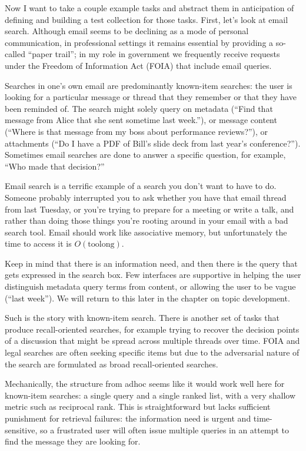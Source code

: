 \documentclass[nobib]{tufte-book}
\begin{document}
Now I want to take a couple example tasks and abstract them in anticipation of defining and building a test collection for those tasks.  First, let's look at email search.  Although email seems to be declining as a mode of personal communication, in professional settings it remains essential by providing a so-called ``paper trail''; in my role in government we frequently receive requests under the Freedom of Information Act (FOIA) that include email queries.

Searches in one's own email are predominantly known-item searches: the user is looking for a particular message or thread that they remember or that they have been reminded of.  The search might solely query on metadata (``Find that message from Alice that she sent sometime last week.''), or message content (``Where is that message from my boss about performance reviews?''), or attachments (``Do I have a PDF of Bill's slide deck from last year's conference?'').  Sometimes email searches are done to answer a specific question, for example, ``Who made that decision?''

Email search is a terrific example of a search you don't want to have to do.  Someone probably interrupted you to ask whether you have that email thread from last Tuesday, or you're trying to prepare for a meeting or write a talk, and rather than doing those things you're rooting around in your email with a bad search tool.  Email should work like associative memory, but unfortunately the time to access it is $O(\mathrm{too long})$.

Keep in mind that there is an information need, and then there is the query that gets expressed in the search box.  Few interfaces are supportive in helping the user distinguish metadata query terms from content, or allowing the user to be vague (``last week'').  We will return to this later in the chapter on topic development.

Such is the story with known-item search.  There is another set of tasks that produce recall-oriented searches, for example trying to recover the decision points of a discussion that might be spread across multiple threads over time.  FOIA and legal searches are often seeking specific items but due to the adversarial nature of the search are formulated as broad recall-oriented searches.

Mechanically, the structure from adhoc seems like it would work well here for known-item searches: a single query and a single ranked list, with a very shallow metric such as reciprocal rank.  This is straightforward but lacks sufficient punishment for retrieval failures: the information need is urgent and time-sensitive, so a frustrated user will often issue multiple queries in an attempt to find the message they are looking for.
\end{document}
